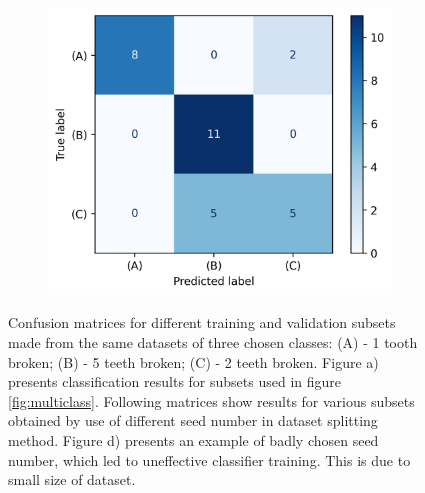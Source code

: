 \documentclass[energies,article,submit,pdftex,moreauthors]{Definitions/mdpi}
\begin{document}
\begin{figure}[t!]
    \begin{subfigure}[t]{0.3\textwidth}
        \centering
        \includegraphics[width=\linewidth]{images/confusion_matrix_multiclass_5}
        \caption{}
    \end{subfigure}
    
    \caption{Confusion matrices for different training and validation subsets made from the same datasets of three chosen classes: (A) - 1 tooth broken; (B) - 5 teeth broken; (C) - 2 teeth broken. Figure a) presents classification results for subsets used in figure \ref{fig:multiclass}. Following matrices show results for various subsets obtained by use of different seed number in dataset splitting method. Figure d) presents an example of badly chosen seed number, which led to uneffective classifier training. This is due to small size of dataset.}
\end{figure}
\unskip
\vspace{5mm}





\end{document}
